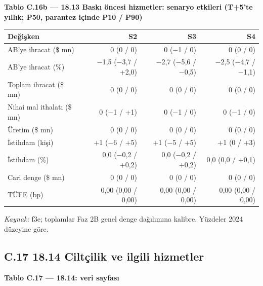 \endgroup


\textbf{Tablo C.16b --- 18.13 Baskı öncesi hizmetler: senaryo etkileri (T+5'te yıllık; P50, parantez içinde P10 / P90)}

\nopagebreak[4]

\begingroup\gbtablo\small

\begin{longtable}[]{@{}lrrr@{}}
\toprule\noalign{}
\textbf{Değişken} & \textbf{S2} & \textbf{S3} & \textbf{S4} \\
\midrule\noalign{}
\endhead
\bottomrule\noalign{}
\endlastfoot
AB'ye ihracat (\$ mn) & 0 (0 / 0) & 0 (−1 / 0) & 0 (0 / 0) \\
AB'ye ihracat (\%) & −1,5 (−3,7 / +2,0) & −2,7 (−5,6 / −0,5) & −2,5 (−4,7 / −1,1) \\
Toplam ihracat (\$ mn) & 0 (0 / 0) & 0 (0 / 0) & 0 (0 / 0) \\
Nihai mal ithalatı (\$ mn) & 0 (−1 / +1) & 0 (−1 / 0) & 0 (−1 / 0) \\
Üretim (\$ mn) & 0 (0 / 0) & 0 (0 / 0) & 0 (0 / 0) \\
İstihdam (kişi) & +1 (−6 / +5) & +1 (−5 / +5) & +1 (0 / +3) \\
İstihdam (\%) & 0,0 (−0,2 / +0,2) & 0,0 (−0,2 / +0,2) & 0,0 (0,0 / +0,1) \\
Cari denge (\$ mn) & 0 (0 / 0) & 0 (0 / 0) & 0 (0 / 0) \\
TÜFE (bp) & 0,00 (0,00 / 0,00) & 0,00 (0,00 / 0,00) & 0,00 (0,00 / 0,00) \\
\end{longtable}

\endgroup

\emph{Kaynak:} \etiketT{} f3e; toplamlar Faz 2B genel denge dağılımına kalibre. Yüzdeler 2024 düzeyine göre.

\hypertarget{nace_kartlar_16-18-c17-1814-ciltuxe7ilik-ve-ilgili-hizmetler}{%
\subsection{C.17 18.14 Ciltçilik ve ilgili hizmetler}\label{nace_kartlar_16-18-c17-1814-ciltuxe7ilik-ve-ilgili-hizmetler}}


\textbf{Tablo C.17 --- 18.14: veri sayfası}

\nopagebreak[4]

\begingroup\gbtablo\small

